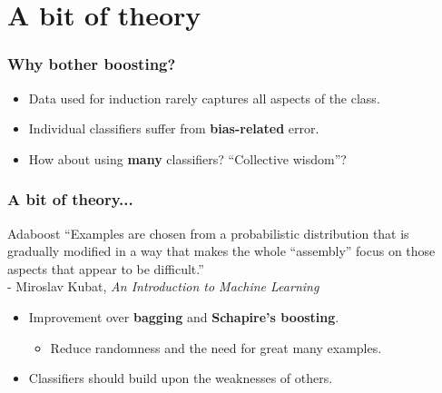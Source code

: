 \documentclass{beamer}
\begin{document}
\section{A bit of theory} %
\begin{frame}
\frametitle{Why bother \textbf{boosting}?}
\begin{itemize}
\item Data used for induction rarely captures all aspects of the class. %
\item Individual classifiers suffer from \textbf{bias-related} error. %
\item How about using \textbf{many} classifiers? ``Collective wisdom''? 
\end{itemize}

\end{frame}
\begin{frame}
\frametitle{A bit of theory...}
\begin{block}{Adaboost}
``Examples are chosen from a probabilistic distribution that is gradually modified in a way that makes the whole ``assembly'' focus on those aspects that appear to be difficult.''\\
- Miroslav Kubat, \textit{An Introduction to Machine Learning}
\end{block}
\begin{itemize}
\item Improvement over \textbf{bagging} and \textbf{Schapire's boosting}. 
\begin{itemize}
\item Reduce randomness and the need for great many examples.
\end{itemize}
\item Classifiers should build upon the weaknesses of others. 
\end{itemize}

\end{frame}
\end{document}
